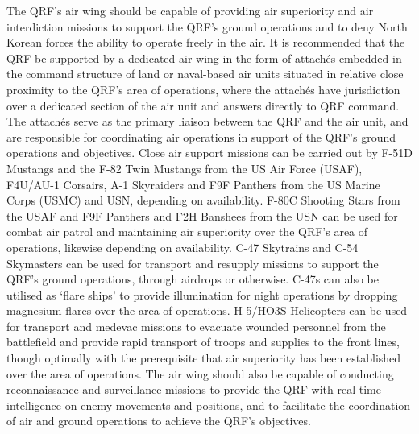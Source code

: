 \documentclass[a4paper,12pt]{article}
\begin{document}
{	The QRF's air wing should be capable of providing air superiority and air interdiction missions to support the QRF's ground operations and to deny North Korean forces the ability to operate freely in the air. It is recommended that the QRF be supported by a dedicated air wing in the form of attachés embedded in the command structure of land or naval-based air units situated in relative close proximity to the QRF's area of operations, where the attachés have jurisdiction over a dedicated section of the air unit and answers directly to QRF command. The attachés serve as the primary liaison between the QRF and the air unit, and are responsible for coordinating air operations in support of the QRF's ground operations and objectives.	Close air support missions can be carried out by F-51D Mustangs and the F-82 Twin Mustangs from the US Air Force (USAF), F4U/AU-1 Corsairs, A-1 Skyraiders and F9F Panthers from the US Marine Corps (USMC) and USN, depending on availability. F-80C Shooting Stars from the USAF and F9F Panthers and F2H Banshees from the USN can be used for combat air patrol and maintaining air superiority over the QRF's area of operations, likewise depending on availability. C-47 Skytrains and C-54 Skymasters can be used for transport and resupply missions to support the QRF's ground operations, through airdrops or otherwise. C-47s can also be utilised as `flare ships' to provide illumination for night operations by dropping magnesium flares over the area of operations. H-5/HO3S Helicopters can be used for transport and medevac missions to evacuate wounded personnel from the battlefield and provide rapid transport of troops and supplies to the front lines, though optimally with the prerequisite that air superiority has been established over the area of operations. The air wing should also be capable of conducting reconnaissance and surveillance missions to provide the QRF with real-time intelligence on enemy movements and positions, and to facilitate the coordination of air and ground operations to achieve the QRF's objectives.
}

\clearpage
\end{document}
